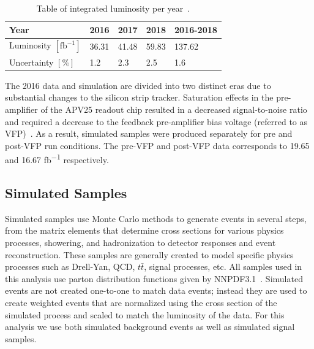 \begin{table}[h]
	\centering
	\caption[Table of integrated luminosity per year.]{Table of integrated luminosity per year~\cite{cmslumi2016,cmslumi2017,cmslumi2018}.}
	\label{tab:intLumi}
	\begin{tabular}{l|l|l|l|l}\hline
		Year & 2016 & 2017 & 2018 & 2016-2018\\
		\hline
		\hline
		Luminosity $[\text{fb}^{-1}]$ & 36.31 & 41.48 & 59.83 & 137.62\\
		\hline	
		Uncertainty $[\%]$ & 1.2 & 2.3 & 2.5 & 1.6\\
		\hline
	\end{tabular}
\end{table}

The 2016 data and simulation are divided into two distinct eras due to substantial changes to the silicon strip tracker. Saturation effects in the pre-amplifier of the APV25 readout chip resulted in a decreased signal-to-noise ratio and required a decrease to the feedback pre-amplifier bias voltage (referred to as VFP)~\cite{CMS-DP-2020-045}. As a result, simulated samples were produced separately for pre and post-VFP run conditions. The pre-VFP and post-VFP data corresponds to 19.65 and 16.67 \unit{fb^{-1}} respectively.

\subsection{Simulated Samples} \label{sec:ana_mc}
Simulated samples use Monte Carlo methods to generate events in several steps, from the matrix elements that determine cross sections for various physics processes, showering, and hadronization to detector responses and event reconstruction. These samples are generally created to model specific physics processes such as Drell-Yan, QCD, $t\bar{t}$, signal processes, etc. All samples used in this analysis use parton distribution functions given by NNPDF3.1~\cite{nnpdf3p1}. Simulated events are not created one-to-one to match data events; instead they are used to create weighted events that are normalized using the cross section of the simulated process and scaled to match the luminosity of the data. For this analysis we use both simulated background events as well as simulated signal samples.

